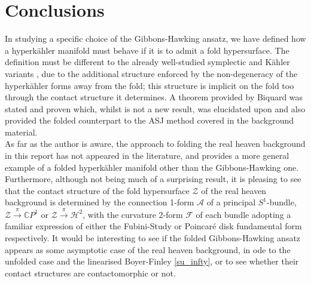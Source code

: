 \documentclass[a4paper,12pt, onecolumn, notitlepage]{article}
\theoremstyle{definition}
\theoremstyle{remark}
\newcommand{\K}{K\"ahler }
\newcommand{\HK}{hyperk\"ahler }
\begin{document}
\section{Conclusions}
In studying a specific choice of the Gibbons-Hawking ansatz, we have defined how a \HK manifold must behave if it is to admit a fold hypersurface. The definition must be different to the already well-studied symplectic and \K variants \cite{dasilva_2000, baykur_2006}, due to the additional structure enforced by the non-degeneracy of the \HK forms away from the fold; this structure is implicit on the fold too through the contact structure it determines. A theorem provided by Biquard \cite{biquard_2015} was stated and proven which, whilst is not a new result, was elucidated upon and also provided the folded counterpart to the ASJ method covered in the background material.\\
As far as the author is aware, the approach to folding the real heaven background in this report has not appeared in the literature, and provides a more general example of a folded \HK manifold other than the Gibbons-Hawking one. Furthermore, although not being much of a surprising result, it is pleasing to see that the contact structure of the fold hypersurface $\mathcal{Z}$ of the real heaven background is determined by the connection 1-form $\mathcal{A}$ of a principal $S^{1}$-bundle, $\mathcal{Z}\overset{\pi}{\rightarrow}\mathbb{C}P^{1}$ or $\mathcal{Z}\overset{\pi}{\rightarrow}\mathcal{H}^{2}$, with the curvature 2-form $\mathcal{F}$ of each bundle adopting a familiar expression of either the Fubini-Study or Poincar\'e disk fundamental form respectively. It would be interesting to see if the folded Gibbons-Hawking ansatz appears as some asymptotic case of the real heaven background, in ode to the unfolded case and the linearised Boyer-Finley \cref{su_infty}, or to see whether their contact structures are contactomorphic or not.


 

	
\end{document}
